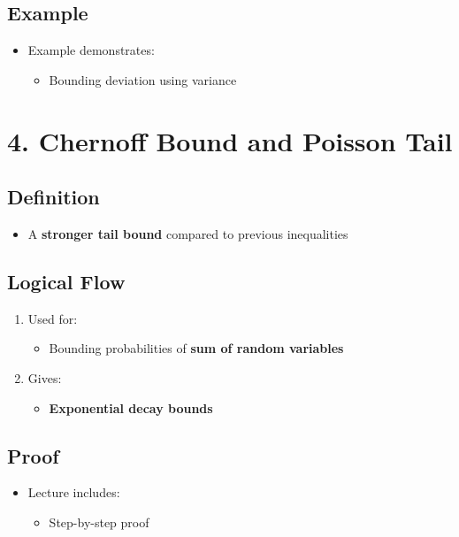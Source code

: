 \documentclass[12pt]{article}
\begin{document}
\subsection*{Example}

\begin{itemize}
    \item Example demonstrates:
    \begin{itemize}
        \item Bounding deviation using variance
    \end{itemize}
\end{itemize}

\section*{4. Chernoff Bound and Poisson Tail}

\subsection*{Definition}

\begin{itemize}
    \item A \textbf{stronger tail bound} compared to previous inequalities
\end{itemize}

\subsection*{Logical Flow}

\begin{enumerate}
    \item Used for:
    \begin{itemize}
        \item Bounding probabilities of \textbf{sum of random variables}
    \end{itemize}
    \item Gives:
    \begin{itemize}
        \item \textbf{Exponential decay bounds}
    \end{itemize}
\end{enumerate}

\subsection*{Proof}

\begin{itemize}
    \item Lecture includes:
    \begin{itemize}
        \item Step-by-step proof
    \end{itemize}
\end{itemize}
\end{document}
